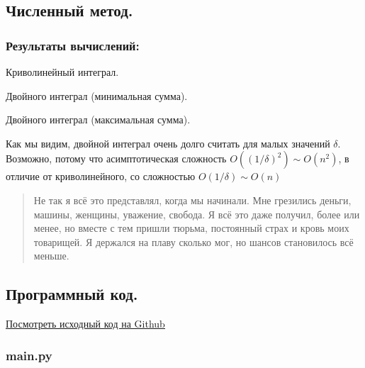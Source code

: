 \subsection{Численный метод.}
\subsubsection{Результаты вычислений:}

\begin{table}[h!t]
    \centering
    
    \caption{Криволинейный интеграл.}
\end{table}

\begin{table}[h!t]
    \centering
    
    \caption{Двойного интеграл (минимальная сумма).}
\end{table}

\begin{table}[h!t]
    \centering
    
    \caption{Двойного интеграл (максимальная сумма).}
\end{table}

Как мы видим, двойной интеграл очень долго считать для малых значений $\delta$. Возможно, потому что асимптотическая сложность $O((1/\delta)^2) \sim O(n^2) $, в отличие от криволинейного, со сложностью $O(1/\delta) \sim O(n)$

\begin{quote}
  Не так я всё это представлял, когда мы начинали. Мне грезились деньги, машины, женщины, уважение, свобода. Я всё это даже получил, более или менее, но вместе с тем пришли тюрьма, постоянный страх и кровь моих товарищей. Я держался на плаву сколько мог, но шансов становилось всё меньше.  
\end{quote}
\newpage
\subsection{Программный код.}

\underline{\href{https://github.com/huji-itmo/calc3-integrals-numerical-method}{Посмотреть исходный код на Github}}

\subsubsection{main.py}


